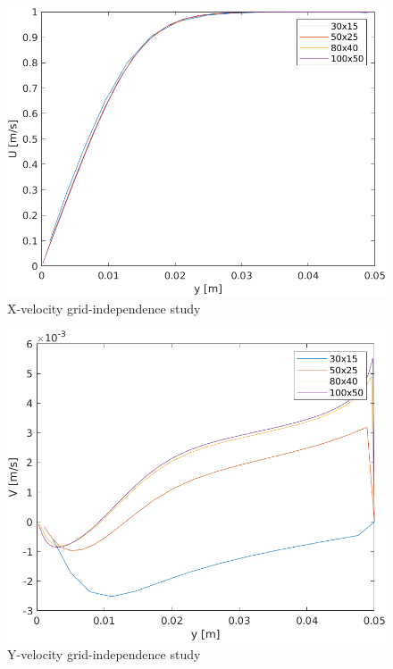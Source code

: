 \documentclass[12pt]{article}
\begin{document}
        \begin{figure}[ht!]
                \centering
                \includegraphics[width=\textwidth]{u_independence.png}
                \caption{X-velocity grid-independence study}
                \label{fig:u_ind}
        \end{figure}

        \begin{figure}[ht!]
                \centering
                \includegraphics[width=\textwidth]{v_independence.png}
                \caption{Y-velocity grid-independence study}
                \label{fig:v_ind}
        \end{figure}
\end{document}
